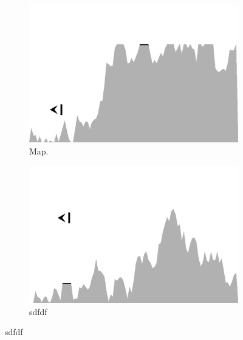 \documentclass[conference]{IEEEtran}
\begin{document}
\begin{figure}[ht]
  \centering



  \centering
        \begin{subfigure}{0.49\textwidth}
                \centering
                \includegraphics[width=1.0\textwidth]{./graphics/map2.pdf}
                \caption{Map. }
                \label{fig:map2}
        \end{subfigure}  
        \begin{subfigure}{0.49\textwidth}
                \centering
                \includegraphics[width=1.0\textwidth]{./graphics/map1-easy.pdf}
                \caption{sdfdf}
                \label{fig:map1-easy}


\end{subfigure}
\end{figure}
\end{document}
